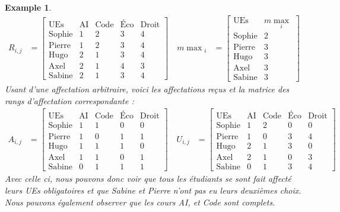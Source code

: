 \documentclass{rapport}
\theoremstyle{definition}
\theoremstyle{remark}
\theoremstyle{plain}
\newtheorem{example}{Example}
\theoremstyle{definition}
\theoremstyle{remark}
\begin{document}
\begin{example}
    $$
    \begin{aligned}
    R_{i,j} &=
        \begin{bmatrix}
            \text{UEs} & \text{AI} & \text{Code} & \text{Éco} & \text{Droit}\\
            \text{Sophie} & 1 & 2 & 3 & 4\\
            \text{Pierre} & 1 & 2 & 3 & 4\\
            \text{Hugo} & 2 & 1 & 3 & 4\\
            \text{Axel} & 2 & 1 & 4 & 3\\
            \text{Sabine} & 2 & 1 & 3 & 4
        \end{bmatrix}
    \quad
    m\!\max\!_i &=
        \begin{bmatrix}
            \text{UEs} & m\!\max_i\\
            \text{Sophie} & 2\\
            \text{Pierre} & 3\\
            \text{Hugo} & 3\\
            \text{Axel} & 3\\
            \text{Sabine} & 3
        \end{bmatrix}
    \end{aligned}
    $$
    Usant d'une affectation arbitraire, voici les affectations reçus et la matrice des rangs d'affectation correspondante :
    $$
    \begin{aligned}
    A_{i,j} &=
        \begin{bmatrix}
            \text{UEs} & \text{AI} & \text{Code} & \text{Éco} & \text{Droit}\\
            \text{Sophie} & 1 & 1 & 0 & 0\\
            \text{Pierre} & 1 & 0 & 1 & 1\\
            \text{Hugo} & 1 & 1 & 1 & 0\\
            \text{Axel} & 1 & 1 & 0 & 1\\
            \text{Sabine} & 0 & 1 & 1 & 1
        \end{bmatrix}
    \quad
    U_{i,j} &=
        \begin{bmatrix}
            \text{UEs} & \text{AI} & \text{Code} & \text{Éco} & \text{Droit}\\
            \text{Sophie} & 1 & 2 & 0 & 0\\
            \text{Pierre} & 1 & 0 & 3 & 4\\
            \text{Hugo} & 2 & 1 & 3 & 0\\
            \text{Axel} & 2 & 1 & 0 & 3\\
            \text{Sabine} & 0 & 1 & 3 & 4
        \end{bmatrix}
    \end{aligned}
    $$
    Avec celle ci, nous pouvons donc voir que tous les étudiants se sont fait affecté leurs UEs obligatoires et que Sabine et Pierre n'ont pas eu leurs deuxièmes choix. 
    Nous pouvons également observer que les cours AI, et Code sont complets. 
\end{example}
\end{document}
